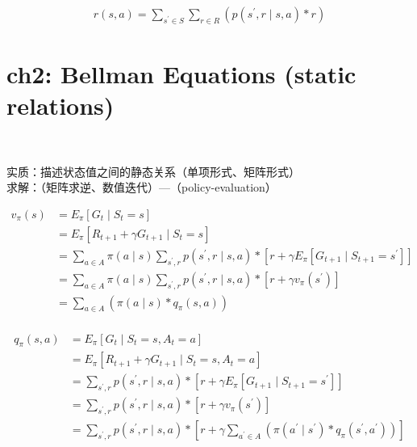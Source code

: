 \documentclass{article}
\begin{document}
\begin{align*}
    r(s, a) = \sum_{s^{\prime} \in S} 
    \sum_{r \in R} 
    \left( p \left( s^{\prime}, r \mid s, a \right) * r \right) 
\end{align*}


\newpage
\section*{ch2: Bellman Equations (static relations)}


~ \\[3pt]
\begin{CJK}{UTF8}{gbsn}
    实质：描述状态值之间的静态关系（单项形式、矩阵形式） \\[3pt]
    求解：（矩阵求逆、数值迭代）---（policy-evaluation） \\[3pt]
\end{CJK}


\begin{align*}
    v_{\pi}(s) 
      &= E_{\pi} \left[ G_{t} \mid S_{t}=s \right] \\[3pt]
      &= E_{\pi} \left[ R_{t+1}+\gamma G_{t+1} \mid S_{t}=s \right] \\[3pt]
      &= \sum_{a \in A} \pi(a \mid s) 
         \sum_{s^{\prime}, r} 
         p \left( s^{\prime}, r \mid s, a \right) * 
         \left[ r + \gamma E_{\pi} 
         \left[ G_{t+1} \mid S_{t+1}=s^{\prime} \right] \right] \\[3pt]
      &= \sum_{a \in A} \pi(a \mid s) 
         \sum_{s^{\prime}, r} 
         p \left( s^{\prime}, r \mid s, a \right) * 
         \left[ r + \gamma 
         v_{\pi} \left( s^{\prime} \right) \right] \\[3pt]
      &= \sum_{a \in A} 
         \left( \pi(a \mid s) * q_{\pi}(s, a) \right) \\[3pt]
\end{align*}

\begin{align*}
    q_{\pi}(s, a) 
      &= E_{\pi} \left[ G_{t} \mid S_{t}=s, A_{t}=a \right] \\[3pt]
      &= E_{\pi} \left[ R_{t+1}+\gamma G_{t+1} 
         \mid S_{t}=s, A_{t}=a \right] \\[3pt]
      &= \sum_{s^{\prime}, r} 
         p \left( s^{\prime}, r \mid s, a \right) * 
         \left[ r + \gamma E_{\pi} 
         \left[ G_{t+1} \mid S_{t+1}=s^{\prime} \right] \right] \\[3pt]
      &= \sum_{s^{\prime}, r} 
         p \left( s^{\prime}, r \mid s, a \right) * 
         \left[ r + \gamma 
         v_{\pi} \left( s^{\prime} \right) \right] \\[3pt]
      &= \sum_{s^{\prime}, r} 
         p \left( s^{\prime}, r \mid s, a \right) * 
         \left[ r + \gamma 
         \sum_{a^{\prime} \in A} 
         \left( \pi \left( a^{\prime} \mid s^{\prime} \right) * 
         q_{\pi} \left( s^{\prime}, a^{\prime} \right) 
         \right) \right] \\[3pt]
\end{align*}
\end{document}
